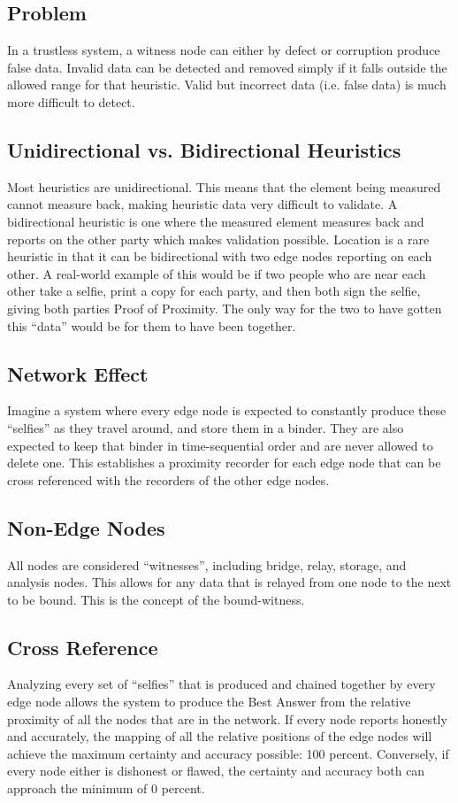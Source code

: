 \documentclass{article}
\begin{document}
\subsection {Problem}
In a trustless system, a witness node can either by defect or corruption produce false data. Invalid data can be detected and removed simply if it falls outside the allowed range for that \gls{heuristic}. Valid but incorrect data (i.e. false data) is much more difficult to detect. 

\subsection {Unidirectional vs. Bidirectional Heuristics}
Most \glspl{heuristic} are unidirectional. This means that the element being measured cannot measure back, making heuristic data very difficult to validate. A bidirectional heuristic is one where the measured element measures back and reports on the other party which makes validation possible. Location is a rare heuristic in that it can be bidirectional with two edge nodes reporting on each other. A real-world example of this would be if two people who are near each other take a selfie, print a copy for each party, and then both sign the selfie, giving both parties Proof of Proximity. The only way for the two to have gotten this ``data'' would be for them to have been together.

\subsection {Network Effect}
Imagine a system where every edge node is expected to constantly produce these ``selfies'' as they travel around, and store them in a binder. They are also expected to keep that binder in time-sequential order and are never allowed to delete one. This establishes a proximity recorder for each edge node that can be cross referenced with the recorders of the other edge nodes.

\subsection {Non-Edge Nodes}
All nodes are considered ``witnesses'', including bridge, relay, storage, and analysis nodes. This allows for any data that is relayed from one node to the next to be bound. This is the concept of the \Gls{bound-witness}.

\subsection {Cross Reference}
Analyzing every set of ``selfies'' that is produced and chained together by every edge node allows the system to produce the Best Answer from the relative proximity of all the nodes that are in the network. If every node reports honestly and accurately, the mapping of all the relative positions of the edge nodes will achieve the maximum \gls{certainty} and \gls{accuracy} possible: 100 percent. Conversely, if every node either is dishonest or flawed, the certainty and accuracy both can approach the minimum of 0 percent.
\end{document}
